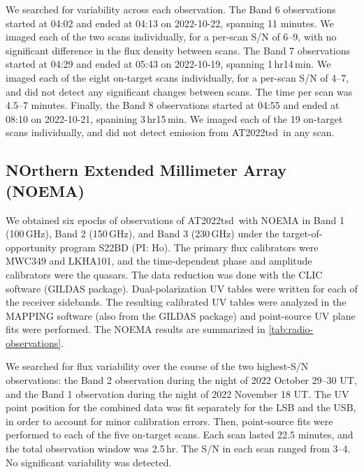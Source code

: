 \documentclass{nature_plusfigure}
\newcommand{\at}{AT2022tsd}
\begin{document}
\begin{methods}
We searched for variability across each observation. The Band 6 observations started at 04:02 and ended at 04:13 on 2022-10-22, spanning 11 minutes. We imaged each of the two scans individually, for a per-scan S/N of 6--9, with no significant difference in the flux density between scans.
The Band 7 observations started at 04:29 and ended at 05:43 on 2022-10-19, spanning 1\,hr14\,min.
We imaged each of the eight on-target scans individually, for a per-scan S/N of 4--7, and did not detect any significant changes between scans. The time per scan was 4.5--7 minutes.
Finally, the Band 8 observations started at 04:55 and ended at 08:10 on 2022-10-21, spanining 3\,hr15\,min. We imaged each of the 19 on-target scans individually, and did not detect emission from \at\ in any scan.

\subsection{NOrthern Extended Millimeter Array (NOEMA)}
\label{Methods:NOEMA}

We obtained six epochs of observations of \at\ with NOEMA in Band 1 (100\,GHz), Band 2 (150\,GHz), and Band 3 (230\,GHz) under the target-of-opportunity program S22BD (PI: Ho). The primary flux calibrators were MWC349 and LKHA101, and the time-dependent phase and amplitude calibrators were the quasars. The data reduction was done with the CLIC software (GILDAS package\cite{GILDAS}). 
Dual-polarization UV tables were written for each of the receiver sidebands. The resulting calibrated UV tables were analyzed in the MAPPING software (also from the GILDAS package) and point-source UV plane fits were performed.
The NOEMA results are summarized in \ref{tab:radio-observations}.

We searched for flux variability over the course of the two highest-S/N observations: the Band 2 observation during the night of 2022 October 29--30 UT, and the Band 1 observation during the night of 2022 November 18 UT.
The UV point position for the combined data was fit separately for the LSB and the USB, in
order to account for minor calibration errors.
Then, point-source fits were performed to each of the five on-target scans. Each scan lasted 22.5 minutes, and the total observation window was 2.5\,hr. The S/N in each scan ranged from 3--4. No significant variability was detected.



\end{methods}
\end{document}
